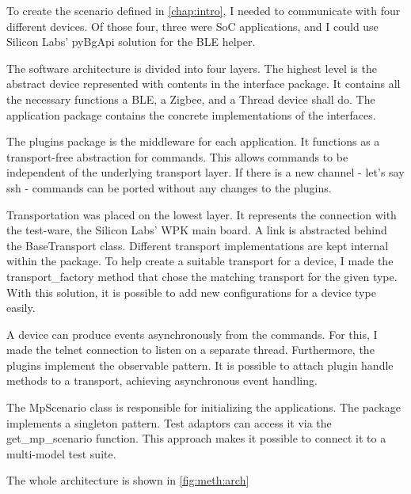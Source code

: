 To create the scenario defined in \autoref{chap:intro}, I needed to communicate with four different devices. Of those four, three were SoC applications, and I could use Silicon Labs' pyBgApi solution for the BLE helper.

The software architecture is divided into four layers. The highest level is the abstract device represented with contents in the interface package. It contains all the necessary functions a BLE, a Zigbee, and a Thread device shall do. The application package contains the concrete implementations of the interfaces.

The plugins package is the middleware for each application. It functions as a transport-free abstraction for commands. This allows commands to be independent of the underlying transport layer. If there is a new channel - let's say ssh - commands can be ported without any changes to the plugins.

Transportation was placed on the lowest layer. It represents the connection with the test-ware, the Silicon Labs' WPK main board. A link is abstracted behind the BaseTransport class. Different transport implementations are kept internal within the package. To help create a suitable transport for a device, I made the transport\_factory method that chose the matching transport for the given type. With this solution, it is possible to add new configurations for a device type easily.

A device can produce events asynchronously from the commands. For this, I made the telnet connection to listen on a separate thread. Furthermore, the plugins implement the observable pattern. It is possible to attach plugin handle methods to a transport, achieving asynchronous event handling.

The MpScenario class is responsible for initializing the applications. The package implements a singleton pattern. Test adaptors can access it via the get\_mp\_scenario function. This approach makes it possible to connect it to a multi-model test suite.

The whole architecture is shown in \autoref{fig:meth:arch}

